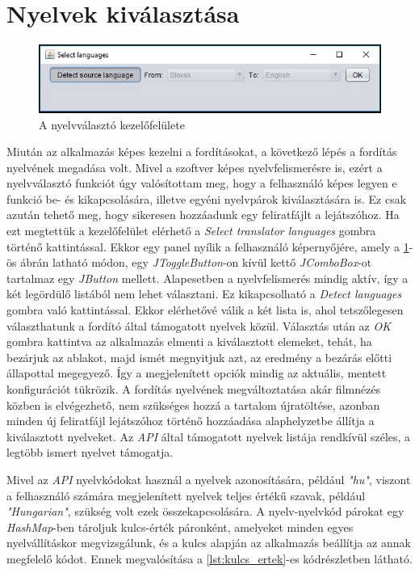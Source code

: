 \section{Nyelvek kiválasztása}

\begin{figure}[h!]
  \includegraphics[width=\linewidth]{images/language_selection.jpg}
  \caption{A nyelvválasztó kezelőfelülete}
  \label{fig:language_selection}
\end{figure}

Miután az alkalmazás képes kezelni a fordításokat, a következő lépés a fordítás nyelvének megadása volt. Mivel a szoftver képes nyelvfelismerésre is, ezért a nyelvválasztó funkciót úgy valósítottam meg, hogy a felhasználó képes legyen e funkció be- és kikapcsolására, illetve egyéni nyelvpárok kiválasztására is.  Ez csak azután tehető meg, hogy sikeresen hozzáadunk egy feliratfájlt a lejátszóhoz. Ha ezt megtettük a kezelőfelület elérhető a \textit{Select translator languages} gombra történő kattintással.  Ekkor egy panel nyílik a felhasználó képernyőjére, amely a \ref{fig:language_selection}-ös ábrán latható módon, egy \textit{JToggleButton}-on kívül kettő \textit{JComboBox}-ot tartalmaz egy \textit{JButton} mellett. Alapesetben a nyelvfelismerés mindig aktív, így a két legördülő listából nem lehet választani. Ez kikapcsolható a \textit{Detect languages} gombra való kattintással. Ekkor elérhetővé válik a két lista is, ahol tetszőlegesen választhatunk a fordító által támogatott nyelvek közül. Választás után az \textit{OK} gombra kattintva az alkalmazás elmenti a kiválasztott elemeket, tehát, ha bezárjuk az ablakot, majd ismét megnyitjuk azt, az eredmény a bezárás előtti állapottal megegyező. Így a megjelenített opciók mindig az aktuális, mentett konfigurációt tükrözik. A fordítás nyelvének megváltoztatása akár filmnézés közben is elvégezhető, nem szükséges hozzá a tartalom újratöltése, azonban minden új feliratfájl lejátszóhoz történő hozzáadása alaphelyzetbe állítja a kiválasztott nyelveket. Az \textit{API} által támogatott nyelvek listája rendkívül széles, a legtöbb ismert nyelvet támogatja.

Mivel az \textit{API} nyelvkódokat használ a nyelvek azonosítására, például \textit{"hu"}, viszont a felhasználó számára megjelenített nyelvek teljes értékű szavak, például \textit{"Hungarian"}, szükség volt ezek összekapcsolására. A nyelv-nyelvkód párokat egy \textit{HashMap}-ben tároljuk kulcs-érték páronként, amelyeket minden egyes nyelvállításkor megvizsgálunk, és  a kulcs alapján az alkalmazás beállítja az annak megfelelő kódot. Ennek megvalósítása a \ref{lst:kulcs_ertek}-es kódrészletben látható.

